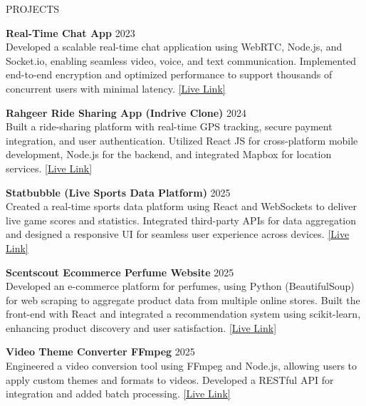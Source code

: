 \documentclass{resume}
\begin{document}

\begin{rSection}{PROJECTS}

\textbf{Real-Time Chat App} \hfill {2023}\\
Developed a scalable real-time chat application using WebRTC, Node.js, and Socket.io, enabling seamless video, voice, and text communication. Implemented end-to-end encryption and optimized performance to support thousands of concurrent users with minimal latency. \href{https://chapapp-24ja.onrender.com/}{[Live Link]}

\textbf{Rahgeer Ride Sharing App (Indrive Clone)} \hfill {2024}\\
Built a ride-sharing platform with real-time GPS tracking, secure payment integration, and user authentication. Utilized React JS for cross-platform mobile development, Node.js for the backend, and integrated Mapbox for location services. \href{https://project-integrated.onrender.com/}{[Live Link]}

\textbf{Statbubble (Live Sports Data Platform)} \hfill {2025}\\
Created a real-time sports data platform using React and WebSockets to deliver live game scores and statistics. Integrated third-party APIs for data aggregation and designed a responsive UI for seamless user experience across devices. \href{https://statbubbles-5r8k.onrender.com/}{[Live Link]}

\textbf{Scentscout Ecommerce Perfume Website} \hfill {2025}\\
Developed an e-commerce platform for perfumes, using Python (BeautifulSoup) for web scraping to aggregate product data from multiple online stores. Built the front-end with React and integrated a recommendation system using scikit-learn, enhancing product discovery and user satisfaction. \href{https://www.scentsscout.com/}{[Live Link]}

\textbf{Video Theme Converter FFmpeg} \hfill {2025}\\
Engineered a video conversion tool using FFmpeg and Node.js, allowing users to apply custom themes and formats to videos. Developed a RESTful API for integration and added batch processing. \href{https://ffmpeg-41yd.onrender.com/}{[Live Link]}

\end{rSection}
\end{document}
